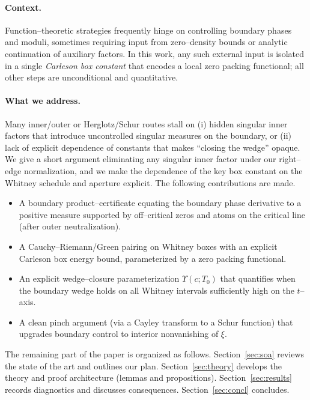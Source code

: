 \documentclass[11pt]{article}
\theoremstyle{definition}
\theoremstyle{remark}
\begin{document}
\paragraph{Context.}
Function--theoretic strategies frequently hinge on controlling boundary phases and moduli, sometimes
requiring input from zero--density bounds or analytic continuation of auxiliary factors.
In this work, any such external input is isolated in a single \emph{Carleson box constant} that
encodes a local zero packing functional; all other steps are unconditional and quantitative.

\paragraph{What we address.}
Many inner/outer or Herglotz/Schur routes stall on
(i) hidden singular inner factors that introduce uncontrolled singular measures on the boundary, or
(ii) lack of explicit dependence of constants that makes ``closing the wedge'' opaque.
We give a short argument eliminating any singular inner factor under our right--edge normalization,
and we make the dependence of the key box constant on the Whitney schedule and aperture explicit.
The following contributions are made. \\
\begin{itemize} %
  \item A boundary product--certificate equating the boundary phase derivative to a positive measure supported by off--critical zeros and atoms on the critical line (after outer neutralization).
  \item A Cauchy--Riemann/Green pairing on Whitney boxes with an explicit Carleson box energy bound, parameterized by a zero packing functional.
  \item An explicit wedge--closure parameterization $\Upsilon(c;T_0)$ that quantifies when the boundary wedge holds on all Whitney intervals sufficiently high on the $t$--axis.
  \item A clean pinch argument (via a Cayley transform to a Schur function) that upgrades boundary control to interior nonvanishing of $\xi$.
\end{itemize}

The remaining part of the paper is organized as follows. 
Section~\ref{sec:soa} reviews the state of the art and outlines our plan.
Section~\ref{sec:theory} develops the theory and proof architecture (lemmas and propositions).
Section~\ref{sec:results} records diagnostics and discusses consequences.
Section~\ref{sec:concl} concludes.
\end{document}

